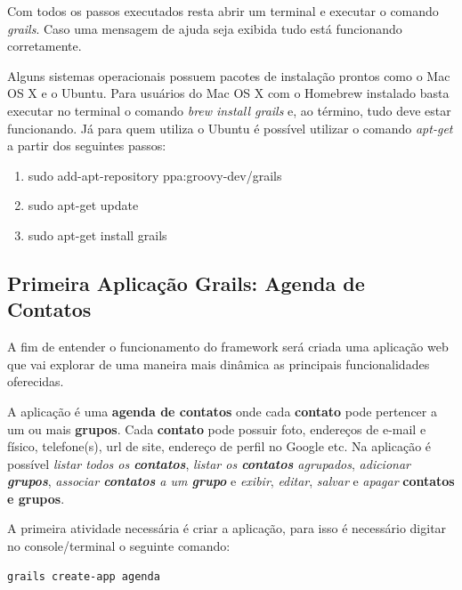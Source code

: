 \documentclass[12pt]{article}
\begin{document}
    Com todos os passos executados resta abrir um terminal e executar o comando 
    \emph{grails}. Caso uma mensagem de ajuda seja exibida tudo está funcionando corretamente. 

    Alguns sistemas operacionais possuem pacotes de instalação prontos como o Mac
    OS X e o Ubuntu. Para usuários do Mac OS X com o Homebrew instalado basta executar
    no terminal o comando \emph{brew install grails} e, ao término, tudo deve 
    estar funcionando. Já para quem utiliza o Ubuntu é possível utilizar o comando 
    \emph{apt-get} a partir dos seguintes passos:
    
    \begin{enumerate}
        \item sudo add-apt-repository ppa:groovy-dev/grails
        \item sudo apt-get update
        \item sudo apt-get install grails
    \end{enumerate}

\subsection{Primeira Aplicação Grails: Agenda de Contatos}

    A fim de entender o funcionamento do framework será criada uma aplicação web
    que vai explorar de uma maneira mais dinâmica as principais funcionalidades
    oferecidas.

    A aplicação é uma \textbf{agenda de contatos} onde cada \textbf{contato} pode 
    pertencer a um ou mais \textbf{grupos}. Cada \textbf{contato} pode possuir foto,
    endereços de e-mail e físico, telefone(s), url de site, endereço de perfil no 
    Google etc. Na aplicação é possível \emph{listar todos os \textbf{contatos}}, 
    \emph{listar os \textbf{contatos} agrupados}, \emph{adicionar \textbf{grupos}}, 
    \emph{associar \textbf{contatos} a um \textbf{grupo}} e \emph{exibir}, 
    \emph{editar}, \emph{salvar} e \emph{apagar} \textbf{contatos e grupos}.
    
    A primeira atividade necessária é criar a aplicação, para isso é necessário
    digitar no console/terminal o seguinte comando:
    
    \begin{lstlisting}[basicstyle={\small \ttfamily}]
        grails create-app agenda
    \end{lstlisting}
    
\end{document}
